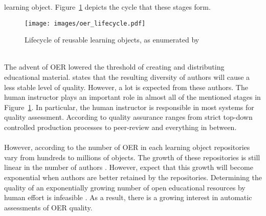 learning object. Figure~\ref{fig:oer_lifecycle} depicts the cycle that these
stages form.\\
\begin{figure}[h!]
	\centering
	\texttt{[image: images/oer\_lifecycle.pdf]}
	\caption[Lifecycle of reusable learning objects]{Lifecycle of reusable learning objects, as enumerated by \citep{Collis2004}}
	\label{fig:oer_lifecycle}
\end{figure}\\
\noindent
The advent of OER lowered the threshold of creating and distributing
educational material. \citet{Weller2010} states that the resulting diversity of
authors will cause a less stable level of quality. However, a lot is expected
from these authors. The human instructor plays an important role in almost all
of the mentioned stages in Figure~\ref{fig:oer_lifecycle}. In particular, the
human instructor is responsible in most systems for quality assessment.
According to \citep{Camilleri2014} quality assurance ranges from strict
top-down controlled production processes to peer-review and everything in
between.\\\\
\noindent
However, according to \citep{Ochoa2009a} the number of OER in each learning object
repositories vary from hundreds to millions of objects. The growth of
these repositories is still linear in the number of authors \citep{Ochoa2009a}.
However, \citeauthor{Ochoa2009a} expect that this growth will become
exponential when authors are better retained by the repositories. Determining
the quality of an exponentially growing number of open educational resources by
human effort is infeasible \citep{Cechinel2011, Ochoa2006, Zemsky2004}.
As a result, there is a growing interest in automatic assessments of OER
quality.
